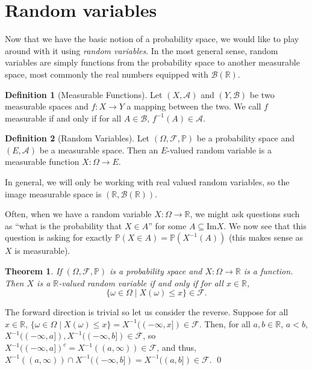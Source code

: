 \documentclass[
]{article}
\newtheorem{theorem}{Theorem}
\theoremstyle{definition}
\newtheorem{definition}{Definition}[section]
\begin{document}
\hypertarget{random-variables}{%
\section{Random variables}\label{random-variables}}

Now that we have the basic notion of a probability space, we would like
to play around with it using \emph{random variables}. In the most
general sense, random variables are simply functions from the
probability space to another measurable space, most commonly the real
numbers equipped with \(\mathcal{B}(\mathbb{R})\).

\begin{definition}[Measurable Functions]
  Let \((X, \mathcal{A})\) and \((Y, \mathcal{B})\) be two measurable spaces and 
  \(f : X \to Y\) a mapping between the two. We call \(f\) measurable if and 
  only if for all \(A \in \mathcal{B}\), \(f^{-1}(A) \in \mathcal{A}\).
\end{definition}

\begin{definition}[Random Variables]
  Let \((\Omega, \mathcal{F}, \mathbb{P})\) be a probability space and 
  \((E, \mathcal{A})\) be a measurable space. Then an \(E\)-valued random variable 
  is a measurable function \(X : \Omega \to E\).
\end{definition}

In general, we will only be working with real valued random variables,
so the image measurable space is
\((\mathbb{R}, \mathcal{B}(\mathbb{R}))\).

Often, when we have a random variable \(X : \Omega \to \mathbb{R}\), we
might ask questions such as ``what is the probability that \(X \in A\)''
for some \(A \subseteq \text{Im} X\). We now see that this question is
asking for exactly \(\mathbb{P}(X \in A) = \mathbb{P}(X^{-1}(A))\) (this
makes sense as \(X\) is measurable).

\begin{theorem}
  If \((\Omega, \mathcal{F}, \mathbb{P})\) is a probability space and 
  \(X : \Omega \to \mathbb{R}\) is a function. Then \(X\) is a 
  \(\mathbb{R}\)-valued random variable if and only if for all 
  \(x \in \mathbb{R}\),
  \[\{\omega \in \Omega \mid X(\omega) \le x\} \in \mathcal{F}.\]
\end{theorem}
\proof

The forward direction is trivial so let us consider the reverse. Suppose
for all \(x \in \mathbb{R}\),
\(\{\omega \in \Omega \mid X(\omega) \le x\} = X^{-1}((-\infty, x]) \in \mathcal{F}\).
Then, for all \(a, b \in \mathbb{R}\), \(a < b\),
\(X^{-1}((-\infty, a]), X^{-1}((-\infty, b]) \in \mathcal{F}\), so
\(X^{-1}((-\infty, a])^c = X^{-1}((a, \infty)) \in \mathcal{F}\), and
thus,
\(X^{-1}((a, \infty)) \cap X^{-1}((-\infty, b]) = X^{-1}((a, b]) \in \mathcal{F}\).
\qed
\end{document}

